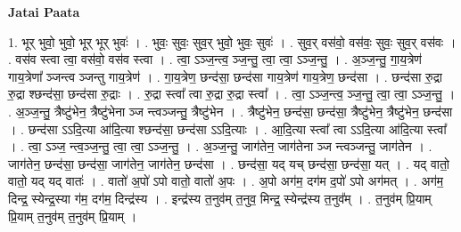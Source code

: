 \documentclass[17pt]{extarticle}
\begin{document}
\textbf{Jatai Paata} \newline

1. भूर् भुवो॒ भुवो॒ भूर् भूर् भुवः॑ । . भुवः॒ सुवः॒ सुव॒र् भुवो॒ भुवः॒ सुवः॑ । . सुव॒र् वस॑वो॒ वस॑वः॒ सुवः॒ सुव॒र् वस॑वः । . वस॑व स्त्वा त्वा॒ वस॑वो॒ वस॑व स्त्वा । . त्वा॒ ऽञ्ज॒न्त्व॒ ञ्ज॒न्तु॒ त्वा॒ त्वा॒ ऽञ्ज॒न्तु॒ । . अ॒ञ्ज॒न्तु॒ गा॒य॒त्रेण॑ गाय॒त्रेणा᳚ ञ्जन्त्व ञ्जन्तु गाय॒त्रेण॑ । . गा॒य॒त्रेण॒ छन्द॑सा॒ छन्द॑सा गाय॒त्रेण॑ गाय॒त्रेण॒ छन्द॑सा । . छन्द॑सा रु॒द्रा रु॒द्रा श्छन्द॑सा॒ छन्द॑सा रु॒द्राः । . रु॒द्रा स्त्वा᳚ त्वा रु॒द्रा रु॒द्रा स्त्वा᳚ । . त्वा॒ ऽञ्ज॒न्त्व॒ ञ्ज॒न्तु॒ त्वा॒ त्वा॒ ऽञ्ज॒न्तु॒ । . अ॒ञ्ज॒न्तु॒ त्रैष्टु॑भेन॒ त्रैष्टु॑भेना ञ्ज न्त्वञ्जन्तु॒ त्रैष्टु॑भेन । . त्रैष्टु॑भेन॒ छन्द॑सा॒ छन्द॑सा॒ त्रैष्टु॑भेन॒ त्रैष्टु॑भेन॒ छन्द॑सा । . छन्द॑सा ऽऽदि॒त्या आ॑दि॒त्या श्छन्द॑सा॒ छन्द॑सा ऽऽदि॒त्याः । . आ॒दि॒त्या स्त्वा᳚ त्वा ऽऽदि॒त्या आ॑दि॒त्या स्त्वा᳚ । . त्वा॒ ऽञ्ज॒ न्त्व॒ञ्ज॒न्तु॒ त्वा॒ त्वा॒ ऽञ्ज॒न्तु॒ । . अ॒ञ्ज॒न्तु॒ जाग॑तेन॒ जाग॑तेना ञ्ज न्त्वञ्जन्तु॒ जाग॑तेन । . जाग॑तेन॒ छन्द॑सा॒ छन्द॑सा॒ जाग॑तेन॒ जाग॑तेन॒ छन्द॑सा । . छन्द॑सा॒ यद् यच् छन्द॑सा॒ छन्द॑सा॒ यत् । . यद् वातो॒ वातो॒ यद् यद् वातः॑ । . वातो॑ अ॒पो॑ ऽपो वातो॒ वातो॑ अ॒पः । . अ॒पो अग॑म॒ दग॑म द॒पो॑ ऽपो अग॑मत् । . अग॑म॒ दिन्द्र॒ स्येन्द्र॒स्या ग॑म॒ दग॑म॒ दिन्द्र॑स्य । . इन्द्र॑स्य त॒नुव॑म् त॒नुव॒ मिन्द्र॒ स्येन्द्र॑स्य त॒नुव᳚म् । . त॒नुव॑म् प्रि॒याम् प्रि॒याम् त॒नुव॑म् त॒नुव॑म् प्रि॒याम् । \newline
\end{document}
